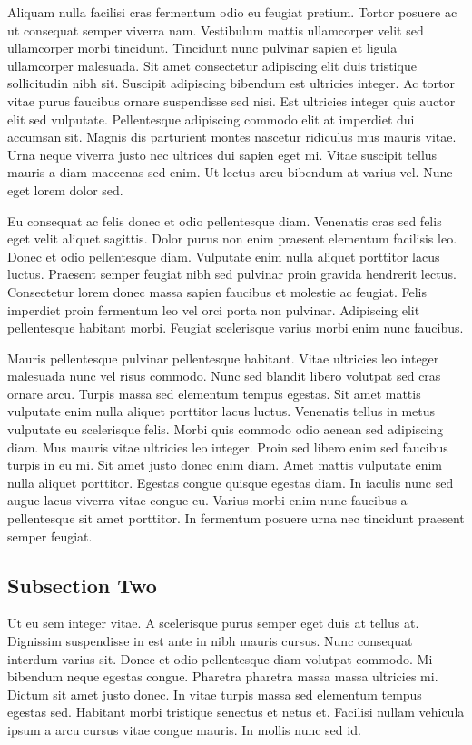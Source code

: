 \documentclass{ledger}
\begin{document}
Aliquam nulla facilisi cras fermentum odio eu feugiat pretium. Tortor posuere ac ut consequat semper viverra nam. Vestibulum mattis ullamcorper velit sed ullamcorper morbi tincidunt. Tincidunt nunc pulvinar sapien et ligula ullamcorper malesuada.\cite{WhitePaper} Sit amet consectetur adipiscing elit duis tristique sollicitudin nibh sit. Suscipit adipiscing bibendum est ultricies integer. Ac tortor vitae purus faucibus ornare suspendisse sed nisi. Est ultricies integer quis auctor elit sed vulputate. Pellentesque adipiscing commodo elit at imperdiet dui accumsan sit. Magnis dis parturient montes nascetur ridiculus mus mauris vitae. Urna neque viverra justo nec ultrices dui sapien eget mi. Vitae suscipit tellus mauris a diam maecenas sed enim. Ut lectus arcu bibendum at varius vel. Nunc eget lorem dolor sed.\cite{note1}

Eu consequat ac felis donec et odio pellentesque diam. Venenatis cras sed felis eget velit aliquet sagittis. Dolor purus non enim praesent elementum facilisis leo. Donec et odio pellentesque diam. Vulputate enim nulla aliquet porttitor lacus luctus.\cite{Booker} Praesent semper feugiat nibh sed pulvinar proin gravida hendrerit lectus. Consectetur lorem donec massa sapien faucibus et molestie ac feugiat. Felis imperdiet proin fermentum leo vel orci porta non pulvinar. Adipiscing elit pellentesque habitant morbi. Feugiat scelerisque varius morbi enim nunc faucibus.

Mauris pellentesque pulvinar pellentesque habitant. Vitae ultricies leo integer malesuada nunc vel risus commodo. Nunc sed blandit libero volutpat sed cras ornare arcu. Turpis massa sed elementum tempus egestas. Sit amet mattis vulputate enim nulla aliquet porttitor lacus luctus. Venenatis tellus in metus vulputate eu scelerisque felis. Morbi quis commodo odio aenean sed adipiscing diam. Mus mauris vitae ultricies leo integer. Proin sed libero enim sed faucibus turpis in eu mi. Sit amet justo donec enim diam. Amet mattis vulputate enim nulla aliquet porttitor. Egestas congue quisque egestas diam. In iaculis nunc sed augue lacus viverra vitae congue eu. Varius morbi enim nunc faucibus a pellentesque sit amet porttitor. In fermentum posuere urna nec tincidunt praesent semper feugiat.

\subsection {Subsection Two}
Ut eu sem integer vitae. A scelerisque purus semper eget duis at tellus at. Dignissim suspendisse in est ante in nibh mauris cursus. Nunc consequat interdum varius sit. Donec et odio pellentesque diam volutpat commodo. Mi bibendum neque egestas congue. Pharetra pharetra massa massa ultricies mi. Dictum sit amet justo donec. In vitae turpis massa sed elementum tempus egestas sed. Habitant morbi tristique senectus et netus et. Facilisi nullam vehicula ipsum a arcu cursus vitae congue mauris. In mollis nunc sed id.
\end{document}
